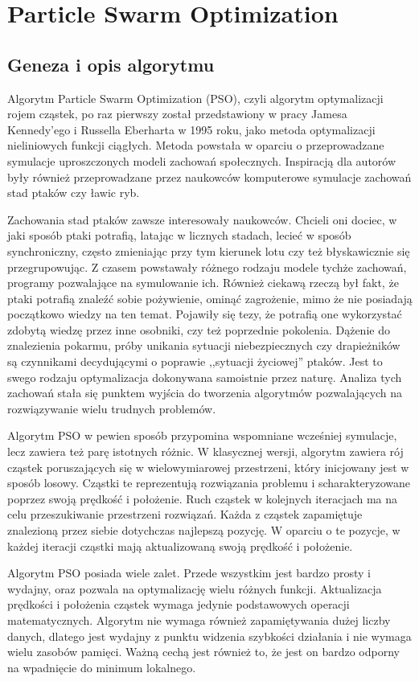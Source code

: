 \section{Particle Swarm Optimization}
\label{sec:PSO}
\subsection{Geneza i opis algorytmu} 
Algorytm Particle Swarm Optimization (PSO), czyli algorytm optymalizacji rojem cząstek, po raz pierwszy został przedstawiony w pracy Jamesa Kennedy'ego i Russella Eberharta w 1995 roku, jako metoda optymalizacji nieliniowych funkcji ciągłych. Metoda powstała w oparciu o przeprowadzane symulacje uproszczonych modeli zachowań społecznych. Inspiracją dla autorów były również  przeprowadzane przez naukowców komputerowe symulacje zachowań stad ptaków czy ławic ryb.

Zachowania stad ptaków zawsze interesowały naukowców. Chcieli oni dociec, w jaki sposób ptaki potrafią, latając w licznych stadach, lecieć w sposób synchroniczny, często zmieniając przy tym kierunek lotu czy też błyskawicznie się przegrupowując. Z czasem powstawały różnego rodzaju modele tychże zachowań, programy pozwalające na symulowanie ich. Również ciekawą rzeczą był fakt, że ptaki potrafią znaleźć sobie pożywienie, ominąć zagrożenie, mimo że nie posiadają początkowo wiedzy na ten temat. Pojawiły się tezy, że potrafią one wykorzystać zdobytą wiedzę przez inne osobniki, czy też poprzednie pokolenia. Dążenie do znalezienia pokarmu, próby unikania sytuacji niebezpiecznych czy drapieżników są czynnikami decydującymi o poprawie ,,sytuacji życiowej'' ptaków. Jest to swego rodzaju optymalizacja dokonywana samoistnie przez naturę. Analiza tych zachowań stała się punktem wyjścia do tworzenia algorytmów pozwalających na rozwiązywanie wielu trudnych problemów.

Algorytm PSO w pewien sposób przypomina wspomniane wcześniej symulacje, lecz zawiera też parę istotnych różnic. W klasycznej wersji, algorytm zawiera rój cząstek poruszających się w wielowymiarowej przestrzeni, który inicjowany jest w sposób losowy. Cząstki te reprezentują rozwiązania problemu i scharakteryzowane poprzez swoją prędkość i położenie. Ruch cząstek w kolejnych iteracjach ma na celu przeszukiwanie przestrzeni rozwiązań. Każda z cząstek zapamiętuje znalezioną przez siebie dotychczas najlepszą pozycję. W oparciu o te pozycje, w każdej iteracji cząstki mają aktualizowaną swoją prędkość i położenie.

Algorytm PSO posiada wiele zalet. Przede wszystkim jest bardzo prosty i wydajny, oraz pozwala na optymalizację wielu różnych funkcji. Aktualizacja prędkości i położenia cząstek wymaga jedynie podstawowych operacji matematycznych. Algorytm nie wymaga również zapamiętywania dużej liczby danych, dlatego jest wydajny z punktu widzenia szybkości działania i nie wymaga wielu zasobów pamięci. Ważną cechą jest również to, że jest on bardzo odporny na wpadnięcie do minimum lokalnego.


